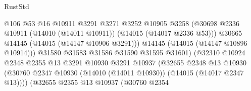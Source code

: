 \begin{lexlean}{RustStd}
\begin{coremodule}
                                              @106
                                              @53
                                              @16
                                              @10911
                                              @3291
                                              @3271
                                              @3252
                                              @10905
                                              @3258
                                              (@30698
                                                @2336
                                                @10911
                                                (@14010 (@14011 @10911))
                                                (@14015 (@14017 @2336 @53)))
                                              @30665
                                              @14145
                                              (@14015 (@14147 @10906 @3291)))
                                            @14145
                                            (@14015 (@14147 @10896 @10914)))
                                          @31580
                                          @31583
                                          @31586
                                          @31590
                                          @31595
                                          @31601)
                                        (@32310
                                          @10924
                                          @2348
                                          @2355
                                          @13
                                          @3291
                                          @10930
                                          @3291
                                          @10937
                                          (@32655
                                            @2348
                                            @13
                                            @10930
                                            (@30760
                                              @2347
                                              @10930
                                              (@14010 (@14011 @10930))
                                              (@14015 (@14017 @2347 @13))))
                                          (@32655
                                            @2355
                                            @13
                                            @10937
                                            (@30760
                                              @2354

\end{coremodule}
\end{lexlean}
